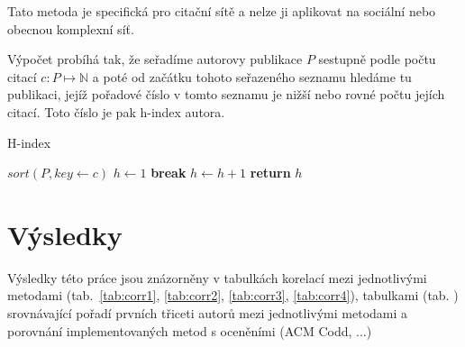 \documentclass{bakalarka}
\begin{document}
Tato metoda je specifická pro citační sítě a nelze ji aplikovat na sociální
nebo obecnou komplexní síť.

Výpočet probíhá tak, že seřadíme autorovy publikace $P$ sestupně podle počtu
citací $c: P \mapsto \mathbb{N}$ a poté od začátku tohoto seřazeného seznamu
hledáme tu publikaci, jejíž pořadové číslo v tomto seznamu je nižší nebo rovné
počtu jejích citací. Toto číslo je pak h-index autora.
\begin{center}
\begin{minipage}{\textwidth}
\begin{algorithm}[H]
	\caption{H-index}
		\label{alg:hindex}

	\begin{algorithmic}[1]
	\Statex
		\State $sort(P, key \gets c)$
		\State $h \gets 1$
				\State \textbf{break}
			\EndIf
			\State $h \gets h + 1$
		\EndFor
		\State \textbf{return} $h$
	\EndFunction
	\end{algorithmic}
\end{algorithm}
\end{minipage}
\end{center}
\mbox{}








\chapter{Výsledky}
Výsledky této práce jsou znázorněny v tabulkách korelací mezi jednotlivými
metodami (tab.~\ref{tab:corr1}, \ref{tab:corr2}, \ref{tab:corr3}, \ref{tab:corr4}), tabulkami (tab. ) srovnávající pořadí prvních
třiceti autorů mezi jednotlivými metodami a porovnání implementovaných metod s
oceněními (ACM Codd, ...)
\end{document}
